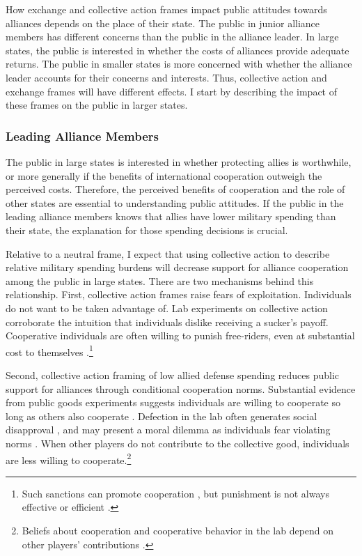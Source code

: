 \documentclass[12pt]{article}
\begin{document}
How exchange and collective action frames impact public attitudes towards alliances depends on the place of their state. 
The public in junior alliance members has different concerns than the public in the alliance leader. 
In large states, the public is interested in whether the costs of alliances provide adequate returns. 
The public in smaller states is more concerned with whether the alliance leader accounts for their concerns and interests. 
Thus, collective action and exchange frames will have different effects. 
I start by describing the impact of these frames on the public in larger states. 


\subsubsection{Leading Alliance Members}


The public in large states is interested in whether protecting allies is worthwhile, or more generally if the benefits of international cooperation outweigh the perceived costs. 
Therefore, the perceived benefits of cooperation and the role of other states are essential to understanding public attitudes. 
If the public in the leading alliance members knows that allies have lower military spending than their state, the explanation for those spending decisions is crucial.  


Relative to a neutral frame, I expect that using collective action to describe relative military spending burdens will decrease support for alliance cooperation among the public in large states. 
There are two mechanisms behind this relationship.
First, collective action frames raise fears of exploitation. 
Individuals do not want to be taken advantage of. 
Lab experiments on collective action corroborate the intuition that individuals dislike receiving a sucker's payoff. 
Cooperative individuals are often willing to punish free-riders, even at substantial cost to themselves \citep{FehrGatcher2000, Seftonetal2007}.\footnote{Such sanctions can promote cooperation \citep{Guererketal2006}, but punishment is not always effective \citep{Houseretal2008} or efficient \citep{Pageetal2005, Seftonetal2007, Randetal2009}.}


Second, collective action framing of low allied defense spending reduces public support for alliances through conditional cooperation norms. 
Substantial evidence from public goods experiments suggests individuals are willing to cooperate so long as others also cooperate \citep{Chaudhuri2011}.
Defection in the lab often generates social disapproval \citep{GachterFehr1999, Cubittetal2011a}, and may present a moral dilemma as individuals fear violating norms \citep{Nielsenetal2014}. 
When other players do not contribute to the collective good, individuals are less willing to cooperate.\footnote{Beliefs about cooperation and cooperative behavior in the lab depend on other players' contributions \citep{FischbacherGachter2010}.}
\end{document}
